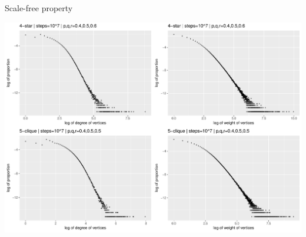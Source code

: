 \begin{block}{Scale-free property}\small
  
  \centering
  \includegraphics[width=0.8\linewidth]{./fig/csilldist4v.pdf}
\end{block}

